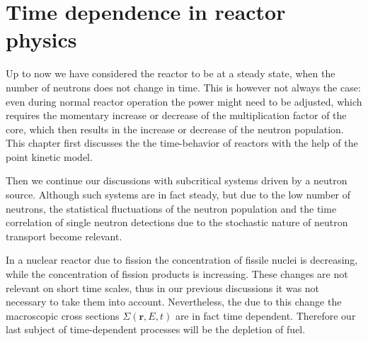 % 
%
% 
%
%
%
%
%

\section{Time dependence in reactor physics}

Up to now we have considered the reactor to be at a steady state, when the number of neutrons does not change in time. This is however not always the case: even during normal reactor operation the power might need to be adjusted, which requires the momentary increase or decrease of the multiplication factor of the core, which then results in the increase or decrease of the neutron population. This chapter first discusses the the time-behavior of reactors with the help of the point kinetic model.

Then we continue our discussions with subcritical systems driven by a neutron source. Although such systems are in fact steady, but due to the low number of neutrons, the statistical fluctuations of the neutron population and the time correlation of single neutron detections due to the stochastic nature of neutron transport become relevant. 

In a nuclear reactor due to fission the concentration of fissile nuclei is decreasing, while the concentration of fission products is increasing. These changes are not relevant on short time scales, thus in our previous discussions it was not necessary to take them into account. Nevertheless, the due to this change the macroscopic cross sections $\Sigma(\mathbf{r},E,t)$ are in fact time dependent. Therefore our last subject of time-dependent processes will be the depletion of fuel.

